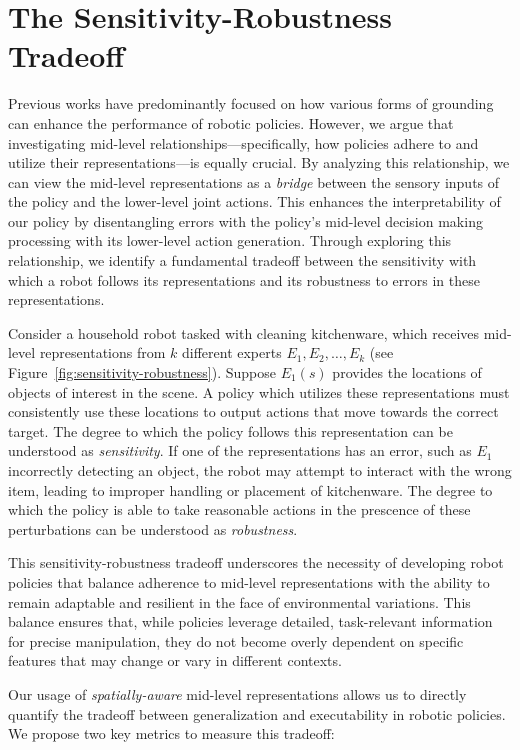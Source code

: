 \documentclass[conference,dvipsnames]{IEEEtran}
\begin{document}
\section{The Sensitivity-Robustness Tradeoff}
Previous works have predominantly focused on how various forms of grounding can enhance the performance of robotic policies. However, we argue that investigating mid-level relationships—specifically, how policies adhere to and utilize their representations—is equally crucial. By analyzing this relationship, we can view the mid-level representations as a \textit{bridge} between the sensory inputs of the policy and the lower-level joint actions. This enhances the interpretability of our policy by disentangling errors with the policy's mid-level decision making processing with its lower-level action generation. Through exploring this relationship, we identify a fundamental tradeoff between the sensitivity with which a robot follows its representations and its robustness to errors in these representations. 

Consider a household robot tasked with cleaning kitchenware, which receives mid-level representations from $k$ different experts $E_{1}, E_{2}, \ldots, E_{k}$ (see Figure~\ref{fig:sensitivity-robustness}). Suppose $E_{1}(s)$ provides the locations of objects of interest in the scene. A policy which utilizes these representations must consistently use these locations to output actions that move towards the correct target. The degree to which the policy follows this representation can be understood as \textit{sensitivity}. If one of the representations has an error, such as $E_{1}$ incorrectly detecting an object, the robot may attempt to interact with the wrong item, leading to improper handling or placement of kitchenware. The degree to which the policy is able to take reasonable actions in the prescence of these perturbations can be understood as \textit{robustness}.

This sensitivity-robustness tradeoff underscores the necessity of developing robot policies that balance adherence to mid-level representations with the ability to remain adaptable and resilient in the face of environmental variations. This balance ensures that, while policies leverage detailed, task-relevant information for precise manipulation, they do not become overly dependent on specific features that may change or vary in different contexts. 

Our usage of \textit{spatially-aware} mid-level representations allows us to directly quantify the tradeoff between generalization and executability in robotic policies. We propose two key metrics to measure this tradeoff:
\end{document}
